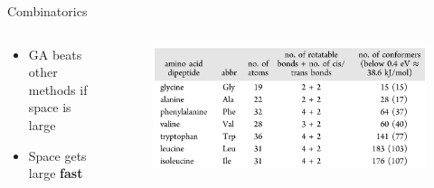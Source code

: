 \documentclass[10pt]{beamer}
\begin{document}
{%
\begin{frame}{Combinatorics}
	\begin{columns}[c] %
		\begin{column}{.4\textwidth}
			\begin{itemize}
				\item {GA beats other methods if space is large}
				\item {Space gets large \textbf{\alert{fast}}}
			\end{itemize}
		\end{column}
		\hfill
		\begin{column}{0.6\textwidth}
			\begin{figure}
				\includegraphics[width=\linewidth]{images/Confnums.png}
			\end{figure}
		\end{column}
	\end{columns}
\end{frame}
}
\end{document}
